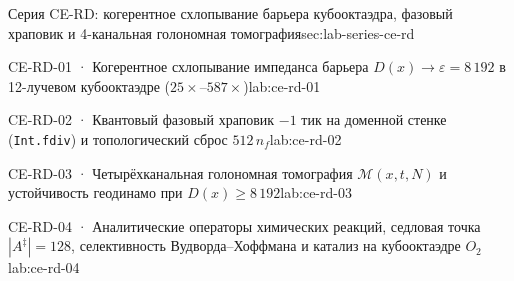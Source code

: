 \begin{labseries}{Серия CE-RD: когерентное схлопывание барьера кубооктаэдра, фазовый храповик и 4-канальная голономная томография}{sec:lab-series-ce-rd}
\begin{labrecord}{CE-RD-01 · Когерентное схлопывание импеданса барьера \texorpdfstring{$D(x)\to\varepsilon=8\,192$}{D(x)->8192} в 12-лучевом кубооктаэдре (\texorpdfstring{$25\times\text{--}587\times$}{25x-587x})}{lab:ce-rd-01}

\end{labrecord}

\begin{labrecord}{CE-RD-02 · Квантовый фазовый храповик \texorpdfstring{$-1$}{-1} тик на доменной стенке (\texttt{Int.fdiv}) и топологический сброс \texorpdfstring{$512\,n_f$}{512 n\_f}}{lab:ce-rd-02}

\end{labrecord}

\begin{labrecord}{CE-RD-03 · Четырёхканальная голономная томография \texorpdfstring{$\mathcal{M}(x,t,N)$}{M(x,t,N)} и устойчивость геодинамо при \texorpdfstring{$D(x)\ge 8\,192$}{D(x)>=8192}}{lab:ce-rd-03}

\end{labrecord}

\begin{labrecord}{CE-RD-04 · Аналитические операторы химических реакций, седловая точка \texorpdfstring{$|A^\ddagger|=128$}{|A|=128}, селективность Вудворда--Хоффмана и катализ на кубооктаэдре \texorpdfstring{$O_2$}{O2}}{lab:ce-rd-04}

\end{labrecord}
\end{labseries}
